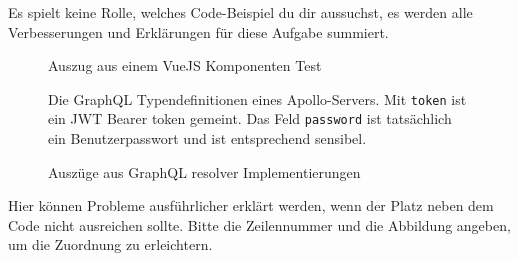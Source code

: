 \documentclass[
addpoints,a4paper,ngerman,answers
]{exam}
\begin{document}
\begin{questions}
\begin{parts}
  Es spielt keine Rolle, welches Code-Beispiel du dir aussuchst, es werden alle
  Verbesserungen und Erklärungen für diese Aufgabe summiert.
\begin{figure}[h]
  
  \caption{Auszug aus einem VueJS Komponenten Test}
\end{figure}
\begin{figure}[h]
  
  \caption{Die GraphQL Typendefinitionen eines Apollo-Servers. Mit \texttt{token}
  ist ein JWT Bearer token gemeint. Das Feld \texttt{password} ist tatsächlich
  ein Benutzerpasswort und ist entsprechend sensibel.}
\end{figure}
\begin{figure}[h]
  
  \caption{Auszüge aus GraphQL resolver Implementierungen}
\end{figure}

\clearpage
  Hier können Probleme ausführlicher erklärt werden, wenn der Platz neben dem
  Code nicht ausreichen sollte. Bitte die Zeilennummer und die Abbildung
  angeben, um die Zuordnung zu erleichtern.

\end{parts}

\end{questions}
\end{document}
